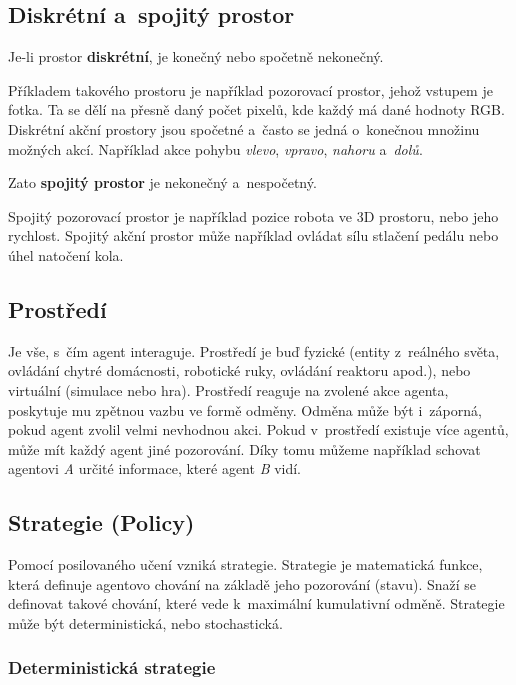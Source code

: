 \subsection{Diskrétní a~spojitý prostor}\label{subsec:diskretni-a-spojity-prostor}

Je-li prostor \textbf{diskrétní}, je konečný nebo spočetně nekonečný.

Příkladem takového prostoru je například pozorovací prostor, jehož vstupem je fotka.
Ta se dělí na přesně daný počet pixelů, kde každý má dané hodnoty RGB.\@
Diskrétní akční prostory jsou spočetné a~často se jedná o~konečnou množinu možných akcí.
Například akce pohybu \textit{vlevo}, \textit{vpravo}, \textit{nahoru} a~\textit{dolů}.

Zato \textbf{spojitý prostor} je nekonečný a~nespočetný.

Spojitý pozorovací prostor je například pozice robota ve 3D prostoru, nebo jeho rychlost.
Spojitý akční prostor může například ovládat sílu stlačení pedálu nebo úhel natočení kola.

\subsection{Prostředí}\label{subsec:prostredi2}

Je vše, s~čím agent interaguje.
Prostředí je buď fyzické (entity z~reálného světa, ovládání chytré domácnosti, robotické ruky, ovládání reaktoru apod.), nebo virtuální (simulace nebo hra).
Prostředí reaguje na zvolené akce agenta, poskytuje mu zpětnou vazbu ve formě odměny.
Odměna může být i~záporná, pokud agent zvolil velmi nevhodnou akci.
Pokud v~prostředí existuje více agentů, může mít každý agent jiné pozorování.
Díky tomu můžeme například schovat agentovi \textit{A} určité informace, které agent \textit{B} vidí.

\subsection{Strategie (Policy)}\label{subsec:strategie}

Pomocí posilovaného učení vzniká strategie.
Strategie je matematická funkce, která definuje agentovo chování na základě jeho pozorování (stavu).
Snaží se definovat takové chování, které vede k~maximální kumulativní odměně.
Strategie může být deterministická, nebo stochastická.

  \subsubsection*{Deterministická strategie}
  
